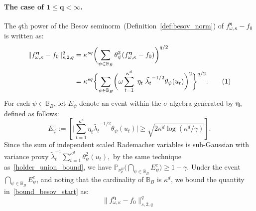 \documentclass[twoside,11pt]{article}
\newcommand\numberthis{\addtocounter{equation}{1}\tag{\theequation}}
\newcommand{\mP}{\mathbb{P}} %
\newcommand{\dimDensity}{d} %
\newcommand{\smoothness}{s}
\newcommand{\ONset}{\mathbb{B}}
\newcommand{\maxErrorTypeOne}{\gamma} %
\newcommand{\binNum}{\kappa}           %
\newcommand{\coef}{\theta}
\newcommand{\besovParamMicroscope}{q}
\begin{document}
\begin{appendix}
	\paragraph{The case of $\mathbf{1 \leq \besovParamMicroscope < }\boldsymbol{\infty}$.}
	The $q$th power of the Besov seminorm~(Definition~\ref{def:besov_norm}) of $
	f^{{\boldsymbol{\eta}}}_{\omega, \binNum}
	-
	f_0
	$ is written as:
	\begin{align*}
		\|f^{{\boldsymbol{\eta}}}_{\omega, \binNum}
		-
		f_0\|^\besovParamMicroscope_{
			\smoothness,
			2,
			\besovParamMicroscope
		}
		& =
		\binNum^{\smoothness \besovParamMicroscope}
		\biggl(
		\sum_{
			\psi
			\in 
			\ONset_{B}
		}
		\coef^2_{\psi}
		(
		f^{{\boldsymbol{\eta}}}_{\omega, \binNum}
		-
		f_0
		)
		\biggr)^{\besovParamMicroscope/2}
		\\&=
		\binNum^{\smoothness \besovParamMicroscope}
		\biggl\{
		\sum_{
			\psi
			\in 
			\ONset_{B}
		}
		\biggl(
		\omega
		\sum_{t=1}^{\binNum^{\dimDensity}}
		\; \eta_t \;\tilde{\lambda_t}^{-1/2}
		\coef_{\psi}(u_t)
		\biggr)^2
		\biggr\}^{\besovParamMicroscope/2}.
		\numberthis
		\label{bound_besov_start}
	\end{align*}
	For each \( \psi \in \ONset_{B} \), let \( E_{\psi} \) denote an event within the \( \sigma \)-algebra generated by \( \boldsymbol{\eta} \), defined as follows:
	\begin{equation*}
		E_{\psi}:= \left[ \big|  \sum_{t=1}^{\binNum^{\dimDensity}} \eta_t \tilde{\lambda_t}^{-1/2} \coef_{\psi}(u_t) \bigr|
		\geq
		\sqrt{2 \binNum^\dimDensity \log ( \binNum^\dimDensity / \maxErrorTypeOne )} \right].  
	\end{equation*}
	Since the sum of independent scaled Rademacher variables is sub-Gaussian with variance proxy
	$
	\tilde{\lambda}_t^{-1} \sum_{t=1}^{\binNum^\dimDensity} \coef_\psi^2(u_t),
	$
	by the same technique as~\eqref{holder_union_bound}, we have $\mP_{\nu_\rho^B}
	\bigl(
	\bigcap_{\psi \in \ONset_B} E_\psi^c
	\bigr) \geq 1-\gamma$.
	Under the event $\bigcap_{\psi \in \ONset_B} E_{\psi}^c$, and noting that the cardinality of $\ONset_B$ is $\binNum^\dimDensity$,
	we bound the quantity in~\eqref{bound_besov_start}  as:
	\begin{equation*}
		\|f^{{\boldsymbol{\eta}}}_{\omega, \binNum}
		-
		f_0\|^\besovParamMicroscope_{
			\smoothness,
			2,
			\besovParamMicroscope
		}
		\;

\end{equation*}
\end{appendix}
\end{document}
